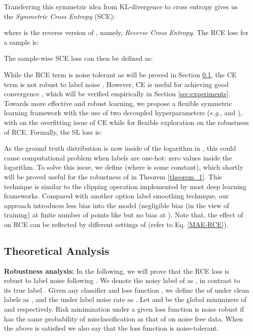 \documentclass[10pt,twocolumn,letterpaper]{article}
\begin{document}
Transferring this symmetric idea from KL-divergence to cross entropy gives us the \textit{Symmetric Cross Entropy} (SCE):

where  is the reverse version of , namely, \emph{Reverse Cross Entropy}. The RCE loss for a sample  is:


The sample-wise SCE loss can then be defined as:


While the RCE term is noise tolerant as will be proved in Section \ref{sec:theor}, the CE term is not robust to label noise \cite{ghosh2017robust}. However, CE is useful for achieving good convergence \cite{zhang2018generalized}, which will be verified empirically in Section \ref{sec:experiments}. 
Towards more effective and robust learning, we propose a flexible symmetric learning framework with the use of two decoupled hyperparameters (\textit{e.g.},  and ), with  on the overfitting issue of CE while  for flexible exploration on the robustness of RCE. Formally, the SL loss is:


As the ground truth distribution  is now inside of the logarithm in , this could cause computational problem when labels are one-hot: zero values inside the logarithm. To solve this issue, we define  (where  is some constant), which shortly will be proved useful for the robustness of  in Theorem \ref{theorem_1}.
This technique is similar to the clipping operation implemented by most deep learning frameworks. Compared with another option label smoothing technique, our approach introduces less bias into the model (negligible bias (in the view of training) at finite number of points like  but no bias at ). Note that, the effect of  on RCE can be reflected by different settings of  (refer to Eq. \eqref{MAE-RCE}).

\subsection{Theoretical Analysis}\label{sec:theor}
\noindent\textbf{Robustness analysis:}
In the following, we will prove that the RCE loss  is robust to label noise following \cite{ghosh2017robust}. We denote the noisy label of  as , in contrast to its true label . Given any classifier  and loss function , we define the  of  under clean labels as , and the  under label noise rate  as . Let  and  be the global minimizers of  and  respectively. Risk minimization under a given loss function is noise robust if  has the same probability of misclassification as that of  on noise free data. When the above is satisfied we also say that the loss function is noise-tolerant.
\end{document}

